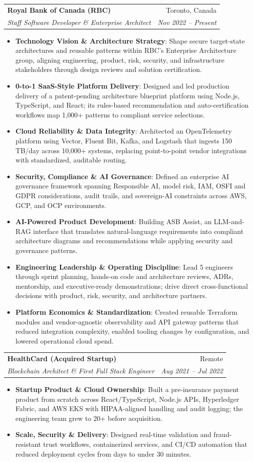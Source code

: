 \documentclass[letterpaper,9.5pt]{article}
\makeatletter
\newcommand{\resumeItem}[2]{\item\small{\textbf{#1}{: #2 \vspace{-2pt}}}}
\newcommand{\resumeSubheading}[4]{\vspace{-2pt}\item\begin{tabular*}{0.97\textwidth}{l@{\extracolsep{\fill}}r}\textbf{#1} & #2 \\\textit{\small#3} & \textit{\small #4} \\\end{tabular*}\vspace{-6pt}}
\newcommand{\resumeItemListStart}{\begin{itemize}}
\newcommand{\resumeItemListEnd}{\end{itemize}\vspace{-6pt}}
\makeatother
\begin{document}
  \resumeSubheading
    {Royal Bank of Canada (RBC)}{Toronto, Canada}
    {Staff Software Developer \& Enterprise Architect}{Nov 2022 -- Present}
  \resumeItemListStart
    \resumeItem{Technology Vision \& Architecture Strategy}
      {Shape secure target-state architectures and reusable patterns within RBC's Enterprise Architecture group, aligning engineering, product, risk, security, and infrastructure stakeholders through design reviews and solution certification.}
    \resumeItem{0-to-1 SaaS-Style Platform Delivery}
      {Designed and led production delivery of a patent-pending architecture blueprint platform using Node.js, TypeScript, and React; its rules-based recommendation and auto-certification workflows map 1,000+ patterns to compliant service selections.}
    \resumeItem{Cloud Reliability \& Data Integrity}
      {Architected an OpenTelemetry platform using Vector, Fluent Bit, Kafka, and Logstash that ingests 150\,TB/day across 10,000+ systems, replacing point-to-point vendor integrations with standardized, auditable routing.}
    \resumeItem{Security, Compliance \& AI Governance}
      {Defined an enterprise AI governance framework spanning Responsible AI, model risk, IAM, OSFI and GDPR considerations, audit trails, and sovereign-AI constraints across AWS, GCP, and OCP environments.}
    \resumeItem{AI-Powered Product Development}
      {Building ASB Assist, an LLM-and-RAG interface that translates natural-language requirements into compliant architecture diagrams and recommendations while applying security and governance patterns.}
    \resumeItem{Engineering Leadership \& Operating Discipline}
      {Lead 5 engineers through sprint planning, hands-on code and architecture reviews, ADRs, mentorship, and executive-ready demonstrations; drive direct cross-functional decisions with product, risk, security, and architecture partners.}
    \resumeItem{Platform Economics \& Standardization}
      {Created reusable Terraform modules and vendor-agnostic observability and API gateway patterns that reduced integration complexity, enabled tooling changes by configuration, and lowered operational cloud spend.}
  \resumeItemListEnd

  \resumeSubheading
    {HealthCard (Acquired Startup)}{Remote}
    {Blockchain Architect \& First Full Stack Engineer}{Aug 2021 -- Jul 2022}
  \resumeItemListStart
    \resumeItem{Startup Product \& Cloud Ownership}
      {Built a pre-insurance payment product from scratch across React/TypeScript, Node.js APIs, Hyperledger Fabric, and AWS EKS with HIPAA-aligned handling and audit logging; the engineering team grew to 20+ before acquisition.}
    \resumeItem{Scale, Security \& Delivery}
      {Designed real-time validation and fraud-resistant trust workflows, containerized services, and CI/CD automation that reduced deployment cycles from days to under 30 minutes.}
  \resumeItemListEnd
\end{document}
